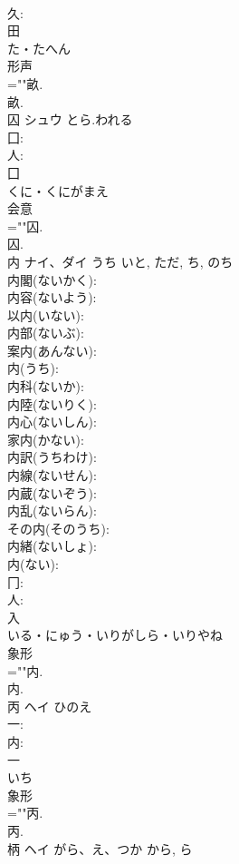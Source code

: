 \documentclass[8pt]{extreport}
\begin{document}
\begin{CJK}{UTF8}{min}
\\	久: 
\\	田	
\\	た・たへん	
\\	形声 
\\	=""畝.
\\	畝.
\\	囚	シュウ	とら.われる		
\\	囗: 
\\	人: 
\\	囗	
\\	くに・くにがまえ	
\\	会意 
\\	=""囚.
\\	囚.
\\	内	ナイ、ダイ	うち	いと, ただ, ち, のち	
\\	内閣(ないかく): 
\\	内容(ないよう): 
\\	以内(いない): 
\\	内部(ないぶ): 
\\	案内(あんない): 
\\	内(うち): 
\\	内科(ないか): 
\\	内陸(ないりく): 
\\	内心(ないしん): 
\\	家内(かない): 
\\	内訳(うちわけ): 
\\	内線(ないせん): 
\\	内蔵(ないぞう): 
\\	内乱(ないらん): 
\\	その内(そのうち): 
\\	内緒(ないしょ): 
\\	内(ない): 
\\	冂: 
\\	人: 
\\	入	
\\	いる・にゅう・いりがしら・いりやね	
\\	象形 
\\	=""内.
\\	内.
\\	丙	ヘイ	ひのえ		
\\	一: 
\\	内: 
\\	一	
\\	いち	
\\	象形 
\\	=""丙.
\\	丙.
\\	柄	ヘイ	がら、え、つか	から, ら	

\end{CJK}
\end{document}
